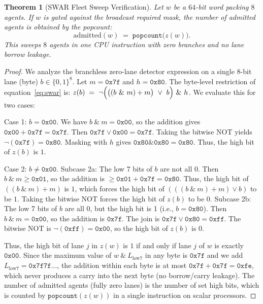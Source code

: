 \documentclass[11pt,oneside]{book}
\theoremstyle{definition}
\theoremstyle{plain}
\newtheorem{theorem}{Theorem}[chapter]
\theoremstyle{remark}
\newcommand{\code}[1]{\texttt{#1}}
\begin{document}
\begin{theorem}[SWAR Fleet Sweep Verification]\label{thm:swar-verify}
Let $w$ be a $64$-bit word packing $8$ agents. %
If $w$ is gated against the broadcast required mask, the number of admitted agents is obtained by the popcount:
\[
\text{admitted}(w)\;=\;\code{popcount}\bigl(z(w)\bigr).
\]
This sweeps $8$ agents in one CPU instruction with zero branches and no lane borrow leakage. %
\end{theorem}

\begin{proof}
We analyze the branchless zero-lane detector expression on a single $8$-bit lane (byte) $b \in \{0, 1\}^8$. %
Let $m = \code{0x7f}$ and $h = \code{0x80}$. %
The byte-level restriction of equation~\eqref{eq:swar} is: $z(b) \;=\; \lnot \Bigl( \bigl((b \ \&\ m) + m\bigr) \ \lor\ b \Bigr) \ \&\ h$. %
We evaluate this for two cases: %

Case 1: $b = \code{0x00}$. We have $b \ \&\ m = \code{0x00}$, so the addition gives $\code{0x00} + \code{0x7f} = \code{0x7f}$. Then $\code{0x7f} \lor \code{0x00} = \code{0x7f}$. Taking the bitwise NOT yields $\lnot(\code{0x7f}) = \code{0x80}$. Masking with $h$ gives $\code{0x80} \& \code{0x80} = \code{0x80}$. Thus, the high bit of $z(b)$ is $1$. %

Case 2: $b \neq \code{0x00}$. Subcase 2a: The low 7 bits of $b$ are not all 0. Then $b \ \&\ m \ge \code{0x01}$, so the addition is $\ge \code{0x01} + \code{0x7f} = \code{0x80}$. Thus, the high bit of $((b \ \&\ m) + m)$ is $1$, which forces the high bit of $(((b \ \&\ m) + m) \lor b)$ to be $1$. Taking the bitwise NOT forces the high bit of $z(b)$ to be $0$. Subcase 2b: The low 7 bits of $b$ are all 0, but the high bit is 1 (i.e., $b = \code{0x80}$). Then $b \ \&\ m = \code{0x00}$, so the addition is $\code{0x7f}$. The join is $\code{0x7f} \lor \code{0x80} = \code{0xff}$. The bitwise NOT is $\lnot(\code{0xff}) = \code{0x00}$, so the high bit of $z(b)$ is $0$. %

Thus, the high bit of lane $j$ in $z(w)$ is $1$ if and only if lane $j$ of $w$ is exactly $\code{0x00}$. %
Since the maximum value of $w \ \&\ L_{\text{low7}}$ in any byte is $\code{0x7f}$ and we add $L_{\text{low7}} = \code{0x7f7f...}$, the addition within each byte is at most $\code{0x7f} + \code{0x7f} = \code{0xfe}$, which never produces a carry into the next byte (no borrow/carry leakage). %
The number of admitted agents (fully zero lanes) is the number of set high bits, which is counted by $\code{popcount}(z(w))$ in a single instruction on scalar processors. %
\end{proof}
\end{document}
